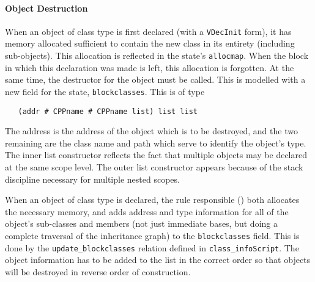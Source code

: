 \documentclass[11pt]{article}
\begin{document}
\paragraph{Object Destruction}
When an object of class type is first declared (with a
\texttt{VDecInit} form), it has memory allocated sufficient to contain
the new class in its entirety (including sub-objects).  This
allocation is reflected in the state's \texttt{allocmap}.  When the
block in which this declaration was made is left, this allocation is
forgotten.  At the same time, the destructor for the object must be
called.  This is modelled with a new field for the state,
\texttt{blockclasses}.  This is of type
\begin{verbatim}
   (addr # CPPname # CPPname list) list list
\end{verbatim}
The address is the address of the object which is to be destroyed, and
the two remaining are the class name and path which serve to identify
the object's type.  The inner list constructor reflects the fact that
multiple objects may be declared at the same scope level.  The outer
list constructor appears because of the stack discipline necessary for
multiple nested scopes.

When an object of class type is declared, the rule responsible
() both allocates
the necessary memory, and adds address and type information for all of
the object's sub-classes and members (not just immediate bases, but
doing a complete traversal of the inheritance graph) to the
\texttt{blockclasses} field.  This is done by the
\texttt{update_blockclasses} relation defined in
\texttt{class_infoScript}.  The object information has to be added
to the list in the correct order so that objects will be destroyed in
reverse order of construction.
\end{document}
